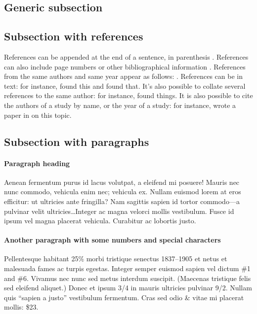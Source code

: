 \documentclass[letterpaper,11pt,leqno]{article}
\begin{document}
\subsection{Generic subsection}\label{s:section}

\subsection{Subsection with references} 

References can be appended at the end of a sentence, in parenthesis \citep{MS15}. References can also include page numbers or other bibliographical information \citep[p. 1305]{MS19}. References from the same authors and same year appear as follows: \citep{LMS18a,LMS18b}. References can be in text: for instance, \citet{M12} found this and \citet[figure 1]{M14} found that. It's also possible to collate several references to the same author: for instance, \citet{M12,M14} found things. It is also possible to cite the authors of a study by name, or the year of a study: for instance, \citeauthor{EMM21} wrote a paper in \citeyear{EMM21} on this topic.

\subsection{Subsection with paragraphs}

\paragraph{Paragraph heading} Aenean fermentum purus id lacus volutpat, a eleifend mi posuere! Mauris nec nunc commodo, vehicula enim nec; vehicula ex. Nullam euismod lorem at eros efficitur: ut ultricies ante fringilla? Nam sagittis sapien id tortor commodo---a pulvinar velit ultricies\ldots Integer ac magna velorci mollis vestibulum. Fusce id ipsum vel magna placerat vehicula. Curabitur ac lobortis justo. 

\paragraph{Another paragraph with some numbers and special characters} Pellentesque habitant 25\% morbi tristique senectus 1837--1905 et netus et malesuada fames ac turpis egestas. Integer semper euismod sapien vel dictum \#1 and \#6. Vivamus nec nunc sed metus interdum suscipit. (Maecenas tristique felis sed eleifend aliquet.) Donec et ipsum 3/4 in mauris ultricies pulvinar 9/2. Nullam quis ``sapien a justo'' vestibulum fermentum. Cras sed odio \& vitae mi placerat mollis: \$23.
\end{document}
